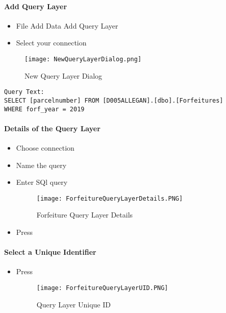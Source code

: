 \clearpage
\paragraph{Add Query Layer}
\vspace{.25in}

\begin{itemize}
\item {\Large File \menuArrow Add Data \menuArrow Add Query Layer}
\item {\Large Select your connection}
\end{itemize}
\begin{figure}[h!]
\centering
    \texttt{[image: NewQueryLayerDialog.png]}
\caption{New Query Layer Dialog}
\end{figure}
\begin{verbatim}
Query Text:
SELECT [parcelnumber] FROM [D005ALLEGAN].[dbo].[Forfeitures]
WHERE forf_year = 2019
\end{verbatim}
\clearpage
\paragraph{Details of the Query Layer}
\begin{itemize}
\item Choose connection
\item Name the query
\item Enter SQl query
\begin{figure}[h!]
\centering
    \texttt{[image: ForfeitureQueryLayerDetails.PNG]}
\caption{Forfeiture Query Layer Details}
\end{figure}
\item Press 
\end{itemize}
\clearpage
\paragraph{Select a Unique Identifier}
\begin{itemize}
\item Press 
\begin{figure}[h!]
\centering
    \texttt{[image: ForfeitureQueryLayerUID.PNG]}
\caption{Query Layer Unique ID}
\end{figure}
\end{itemize}
\clearpage
